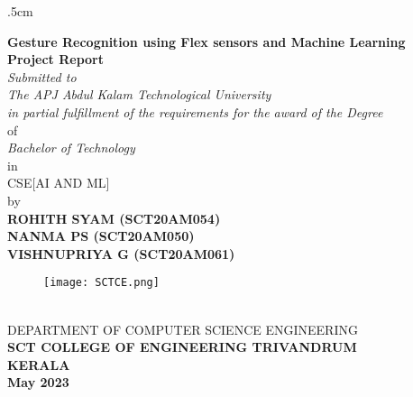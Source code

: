 \documentclass[a4paper,12pt,oneside]{report}
\begin{document}
	
 \thispagestyle{empty}
 \oddsidemargin 1.48cm
 \evensidemargin .5cm

 
	
 \begin{center}
  {\Large \bf Gesture Recognition using Flex sensors and Machine Learning\\}
  \vspace*{0.75cm}
  {\large \textbf {Project Report}}\\
  {\normalsize \it Submitted to \\The APJ Abdul Kalam Technological University}\\
    {\normalsize \it in partial fulfillment of the requirements for the award of the Degree}
  \\of
  \vspace*{0.25cm}
  \\{\em Bachelor of Technology}\\
  \vspace*{1.5mm}
  in\\
  \vspace*{1.5mm} 
 CSE[AI AND ML]\\
  \vspace*{.75cm}
  by
  \vspace*{.25cm}
  \\{\bf ROHITH SYAM (SCT20AM054)}
  \\{\bf NANMA PS (SCT20AM050)}
                   \\{\bf VISHNUPRIYA G (SCT20AM061)}
                   
  \begin{figure}[hbt]
\centering
\centerline{\texttt{[image: SCTCE.png]}}
\end{figure}
\vspace*{0.01cm}
  \\{\footnotesize DEPARTMENT OF COMPUTER SCIENCE ENGINEERING}
  \\{\small \bf SCT COLLEGE OF ENGINEERING TRIVANDRUM}\\
  {\small \bf KERALA\\
   May 2023}
 \end{center}
\end{document}
